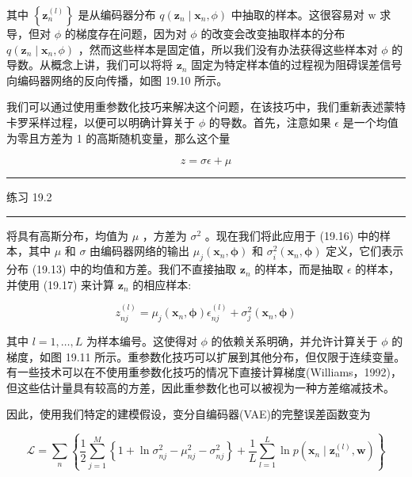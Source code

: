 \documentclass[10pt]{article}
\newcommand{\HRule}{\begin{center}\rule{0.9\linewidth}{0.2mm}\end{center}}
\begin{document}
其中 \(\left\{  {\mathbf{z}}_{n}^{\left( l\right) }\right\}\) 是从编码器分布 \(q\left( {{\mathbf{z}}_{n} \mid  {\mathbf{x}}_{n},\phi }\right)\) 中抽取的样本。这很容易对 \(\mathrm{w}\) 求导，但对 \(\phi\) 的梯度存在问题，因为对 \(\phi\) 的改变会改变抽取样本的分布 \(q\left( {{\mathbf{z}}_{n} \mid  {\mathbf{x}}_{n},\phi }\right)\) ，然而这些样本是固定值，所以我们没有办法获得这些样本对 \(\phi\) 的导数。从概念上讲，我们可以将将 \({\mathbf{z}}_{n}\) 固定为特定样本值的过程视为阻碍误差信号向编码器网络的反向传播，如图 19.10 所示。

我们可以通过使用重参数化技巧来解决这个问题，在该技巧中，我们重新表述蒙特卡罗采样过程，以便可以明确计算关于 \(\phi\) 的导数。首先，注意如果 \(\epsilon\) 是一个均值为零且方差为 1 的高斯随机变量，那么这个量

\[
z = {\sigma \epsilon } + \mu  \tag{19.17}
\]

\HRule

练习 19.2

\HRule

将具有高斯分布，均值为 \(\mu\) ，方差为 \({\sigma }^{2}\) 。现在我们将此应用于 (19.16) 中的样本，其中 \(\mu\) 和 \(\sigma\) 由编码器网络的输出 \({\mu }_{j}\left( {{\mathbf{x}}_{n},\mathbf{\phi }}\right)\) 和 \({\sigma }_{i}^{2}\left( {{\mathbf{x}}_{n},\mathbf{\phi }}\right)\) 定义，它们表示分布 (19.13) 中的均值和方差。我们不直接抽取 \({\mathbf{z}}_{n}\) 的样本，而是抽取 \(\epsilon\) 的样本，并使用 (19.17) 来计算 \({\mathbf{z}}_{n}\) 的相应样本:

\[
{z}_{nj}^{\left( l\right) } = {\mu }_{j}\left( {{\mathbf{x}}_{n},\mathbf{\phi }}\right) {\epsilon }_{nj}^{\left( l\right) } + {\sigma }_{j}^{2}\left( {{\mathbf{x}}_{n},\mathbf{\phi }}\right)  \tag{19.18}
\]

其中 \(l = 1,\ldots ,L\) 为样本编号。这使得对 \(\phi\) 的依赖关系明确，并允许计算关于 \(\phi\) 的梯度，如图 19.11 所示。重参数化技巧可以扩展到其他分布，但仅限于连续变量。有一些技术可以在不使用重参数化技巧的情况下直接计算梯度(Williams，1992)，但这些估计量具有较高的方差，因此重参数化也可以被视为一种方差缩减技术。

因此，使用我们特定的建模假设，变分自编码器(VAE)的完整误差函数变为

\[
\mathcal{L} = \mathop{\sum }\limits_{n}\left\{  {\frac{1}{2}\mathop{\sum }\limits_{{j = 1}}^{M}\left\{  {1 + \ln {\sigma }_{nj}^{2} - {\mu }_{nj}^{2} - {\sigma }_{nj}^{2}}\right\}   + \frac{1}{L}\mathop{\sum }\limits_{{l = 1}}^{L}\ln p\left( {{\mathbf{x}}_{n} \mid  {\mathbf{z}}_{n}^{\left( l\right) },\mathbf{w}}\right) }\right\}   \tag{19.19}
\]
\end{document}
